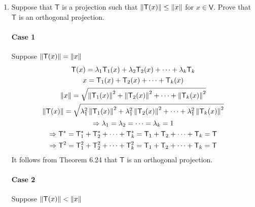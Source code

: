 \begin{enumerate}
\item Suppose that $\mathsf{T}$ is a projection such that
  $\left\lVert\mathsf{T}(x)\right\rVert \leq \left\lVert x\right\rVert$ for $x \in \mathsf{V}.$ Prove
  that $\mathsf{T}$ is an orthogonal projection.
\paragraph{Case 1} Suppose $\left\lVert\mathsf{T}(x)\right\rVert= \left\lVert x\right\rVert$
\begin{gather}
\mathsf{T}(x) = \lambda_1\mathsf{T}_1(x) + \lambda_2\mathsf{T}_2(x) +
\dotsb + \lambda_k\mathsf{T}_k\\
x = \mathsf{T}_1(x) + \mathsf{T}_2(x) + \dotsb + \mathsf{T}_k(x)\\
\left\lVert x\right\rVert = \sqrt{
 \left\lVert\mathsf{T}_1(x)\right\rVert^2 + \left\lVert\mathsf{T}_2(x)\right\rVert^2 + \dotsb + \left\lVert\mathsf{T}_k(x)\right\rVert^2
}\\
\left\lVert\mathsf{T}(x)\right\rVert = \sqrt{
 \lambda_1^2\left\lVert\mathsf{T}_1(x)\right\rVert^2 +
 \lambda_1^2\left\lVert\mathsf{T}_2(x)\right\rVert^2 + \dotsb +
 \lambda_1^2\left\lVert\mathsf{T}_k(x)\right\rVert^2
}\\
\Rightarrow \lambda_1 = \lambda_2 = \dotsb = \lambda_k = 1\\
\Rightarrow \mathsf{T}^* = \mathsf{T}_1^* + \mathsf{T}_2^* + \dotsb +
\mathsf{T}_k^* =  \mathsf{T}_1 + \mathsf{T}_2 + \dotsb +
\mathsf{T}_k = \mathsf{T}\\
\Rightarrow \mathsf{T}^2 =  \mathsf{T}_1^2 + \mathsf{T}_2^2 + \dotsb +
\mathsf{T}_k^2 = \mathsf{T}_1 + \mathsf{T}_2 + \dotsb +
\mathsf{T}_k = \mathsf{T}
\end{gather}
It follows from Theorem 6.24 that $\mathsf{T}$ is an orthogonal projection.
\paragraph{Case 2} Suppose $\left\lVert\mathsf{T}(x)\right\rVert < \left\lVert x\right\rVert$
\end{enumerate}
